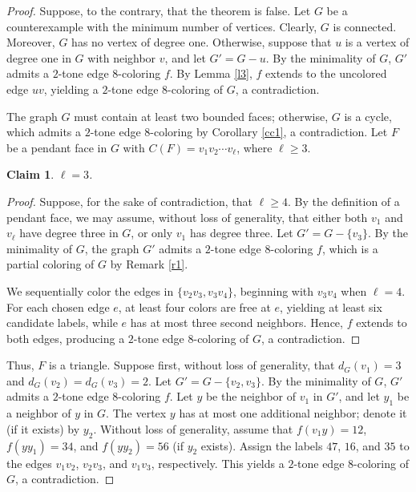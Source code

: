 \documentclass[12pt]{article}
\theoremstyle{plain}
\numberwithin{theorem}{section}
\numberwithin{conjecture}{section}
\numberwithin{corollary}{section}
\numberwithin{example}{section}
\numberwithin{lemma}{section}
\numberwithin{proposition}{section}
\numberwithin{problem}{section}
\numberwithin{remark}{section}
\newtheorem{claim}{Claim}
\numberwithin{claim}{theorem}
\numberwithin{definition}{section}
\begin{document}
\begin{proof} 
Suppose, to the contrary, that the theorem is false. Let $G$ be a counterexample with the minimum number of vertices. Clearly, $G$ is connected. Moreover, $G$ has no vertex of degree one. Otherwise, suppose that $u$ is a vertex of degree one in $G$ with neighbor $v$, and let $G' = G - u$. By the minimality of $G$, $G'$ admits a $2$-tone edge $8$-coloring $f$. By Lemma \ref{l3}, $f$ extends to the uncolored edge $uv$, yielding a $2$-tone edge $8$-coloring of $G$, a contradiction.

\noindent The graph $G$ must contain at least two bounded faces; otherwise, $G$ is a cycle, which admits a $2$-tone edge $8$-coloring by Corollary \ref{cc1}, a contradiction. Let $F$ be a pendant face in $G$ with $C(F)=v_1v_2\cdots v_\ell$, where $\ell\ge 3$.

\begin{claim}
$\ell= 3$.
\end{claim}

\begin{proof}
Suppose, for the sake of contradiction, that $\ell \ge 4$. By the definition of a pendant face, we may assume, without loss of generality, that either both $v_1$ and $v_\ell$ have degree three in $G$, or only $v_1$ has degree three. Let $G' = G - \{v_3\}$. By the minimality of $G$, the graph $G'$ admits a $2$-tone edge $8$-coloring $f$, which is a partial coloring of $G$ by Remark \ref{r1}. 

\noindent We sequentially color the edges in $\{v_2v_3,v_3v_4\}$, beginning with $v_3v_4$ when $\ell=4$. For each chosen edge $e$, at least four colors are free at $e$, yielding at least six candidate labels, while $e$ has at most three second neighbors. Hence, $f$ extends to both edges, producing a $2$-tone edge $8$-coloring of $G$, a contradiction.\end{proof}

\noindent Thus, $F$ is a triangle. Suppose first, without loss of generality, that $d_G(v_1)=3$ and $d_G(v_2)=d_G(v_3)=2$. Let $G'=G-\{v_2,v_3\}$. By the minimality of $G$, $G'$ admits a $2$-tone edge $8$-coloring $f$. Let $y$ be the neighbor of $v_1$ in $G'$, and let $y_1$ be a neighbor of $y$ in $G$. The vertex $y$ has at most one additional neighbor; denote it (if it exists) by $y_2$. Without loss of generality, assume that $f(v_1y)=12$, $f(yy_1)=34$, and $f(yy_2)=56$ (if $y_2$ exists). Assign the labels $47$, $16$, and $35$ to the edges $v_1v_2$, $v_2v_3$, and $v_1v_3$, respectively. This yields a $2$-tone edge $8$-coloring of $G$, a contradiction.


\end{proof}
\end{document}
